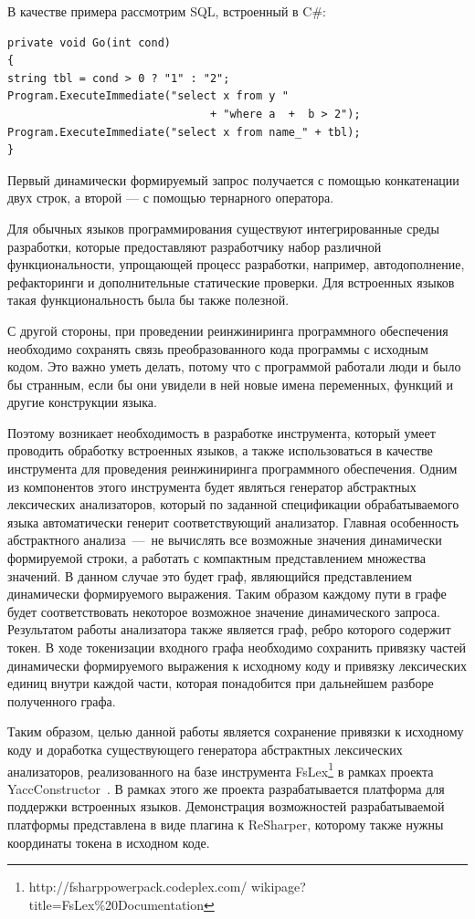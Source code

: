 В качестве примера рассмотрим SQL, встроенный в C\#:

\begin{verbatim}
private void Go(int cond)
{
string tbl = cond > 0 ? "1" : "2";
Program.ExecuteImmediate("select x from y " 
                               + "where a  +  b > 2");
Program.ExecuteImmediate("select x from name_" + tbl);
}
\end{verbatim}

Первый динамически формируемый запрос получается с помощью конкатенации двух строк, а второй --- с помощью тернарного оператора.

Для обычных языков программирования существуют интегрированные среды разработки, которые предоставляют разработчику набор различной 
функциональности, упрощающей процесс разработки, например, автодополнение, рефакторинги и дополнительные статические проверки.
Для встроенных языков такая функциональность была бы также полезной.

С другой стороны, при проведении реинжиниринга программного обеспечения необходимо сохранять связь преобразованного кода программы
с исходным кодом.  Это важно уметь делать, потому что с  программой работали люди и было бы странным, если бы они увидели в ней новые 
имена переменных, функций и другие конструкции языка.  

Поэтому возникает необходимость в разработке инструмента, который умеет проводить обработку встроенных языков, а также использоваться
в качестве инструмента для проведения реинжиниринга программного обеспечения. Одним из компонентов этого инструмента будет 
являться генератор абстрактных лексических анализаторов, который по заданной спецификации обрабатываемого языка автоматически генерит 
соответствующий  анализатор. Главная особенность абстрактного анализа~---~не вычислять все возможные значения динамически формируемой 
строки, а работать с компактным представлением множества значений.   В данном случае это будет граф, являющийся представлением динамически 
формируемого выражения.  Таким образом каждому пути в графе будет соответствовать некоторое возможное значение динамического запроса.
Результатом работы анализатора также является граф, ребро которого содержит токен. В ходе токенизации входного графа необходимо сохранить 
привязку частей динамически формируемого выражения к исходному коду и привязку лексических единиц внутри каждой части, которая понадобится 
при дальнейшем разборе полученного графа. 

Таким образом, целью данной работы является сохранение привязки к исходному коду и доработка существующего генератора абстрактных лексических 
анализаторов, реализованного на базе инструмента FsLex\footnote{http://fsharppowerpack.codeplex.com/ wikipage?title=FsLex\%20Documentation} 
в рамках проекта YaccConstructor~\cite{YC_article}. В рамках этого же проекта разрабатывается платформа для поддержки встроенных языков. 
Демонстрация возможностей разрабатываемой платформы представлена в виде плагина к ReSharper, которому также нужны координаты токена в 
исходном коде. 

